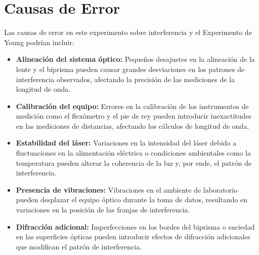 \section{Causas de Error}
Las causas de error en este experimento sobre interferencia y el Experimento de Young podrían incluir:

\begin{itemize}
    \item \textbf{Alineación del sistema óptico:} Pequeños desajustes en la alineación de la lente y el biprisma pueden causar grandes desviaciones en los patrones de interferencia observados, afectando la precisión de las mediciones de la longitud de onda.
    \item \textbf{Calibración del equipo:} Errores en la calibración de los instrumentos de medición como el flexómetro y el pie de rey pueden introducir inexactitudes en las mediciones de distancias, afectando los cálculos de longitud de onda.
    \item \textbf{Estabilidad del láser:} Variaciones en la intensidad del láser debido a fluctuaciones en la alimentación eléctrica o condiciones ambientales como la temperatura pueden alterar la coherencia de la luz y, por ende, el patrón de interferencia.
    \item \textbf{Presencia de vibraciones:} Vibraciones en el ambiente de laboratorio pueden desplazar el equipo óptico durante la toma de datos, resultando en variaciones en la posición de las franjas de interferencia.
    \item \textbf{Difracción adicional:} Imperfecciones en los bordes del biprisma o suciedad en las superficies ópticas pueden introducir efectos de difracción adicionales que modifican el patrón de interferencia.
\end{itemize}

